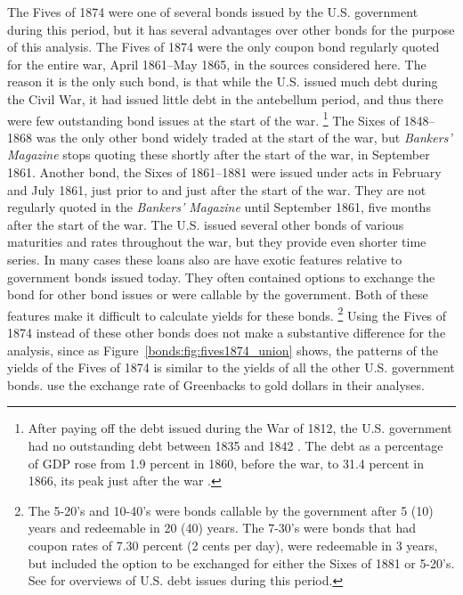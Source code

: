 The Fives of 1874 were one of several bonds issued by the U.S. government during this period, but it has several advantages over other bonds for the purpose of this analysis.
The Fives of 1874 were the only coupon bond regularly quoted for the entire war, April 1861--May 1865, in the sources considered here.
The reason it is the only such bond, is that while the U.S. issued much debt during the Civil War, it had issued little debt in the antebellum period, and thus there were few outstanding bond issues at the start of the war.%
\footnote{
  After paying off the debt issued during the War of 1812, the U.S. government had no outstanding debt between 1835 and 1842 \parencite[297]{HomerSylla2005}.
  The debt as a percentage of GDP rose from 1.9 percent in 1860, before the war, to 31.4 percent in 1866, its peak just after the war \parencites{CBO2012}{CBO2012a}.
}
The Sixes of 1848--1868 was the only other bond widely traded at the start of the war, but \textit{Bankers' Magazine} stops quoting these shortly after the start of the war,  in September 1861.
Another bond, the  Sixes of 1861--1881 were issued under acts in February and July 1861, just prior to and just after the start of the war.
They are not regularly quoted in the \textit{Bankers' Magazine} until September 1861, five months after the start of the war.
The U.S. issued several other bonds of various maturities and rates throughout the war, but they provide even shorter time series.
In many cases these loans also are have exotic features relative to government bonds issued today.
They often contained options to exchange the bond for other bond issues or were callable by the government. 
Both of these features make it difficult to calculate yields for these bonds.%
\footnote{
  The 5-20's and 10-40's were bonds callable by the government after 5 (10) years and redeemable in 20 (40) years.
  The 7-30's were bonds that had coupon rates of 7.30 percent (2 cents per day), were redeemable in 3 years, but included the option to be exchanged for either the Sixes of 1881 or 5-20's.
  See \textcites{Bayley1882}{DeKnight1900}[297--309]{HomerSylla2005} for overviews of U.S. debt issues during this period.
}
Using the Fives of 1874 instead of these other bonds does not make a substantive difference for the analysis, since as Figure~\ref{bonds:fig:fives1874_union} shows, the patterns of the yields  of the Fives of 1874 is similar to the yields of all the other U.S. government bonds.
\textcites{WillardGuinnaneEtAl1996}{McCandless1996}{SmithSmith1997} use the exchange rate of Greenbacks to gold dollars in their analyses.
